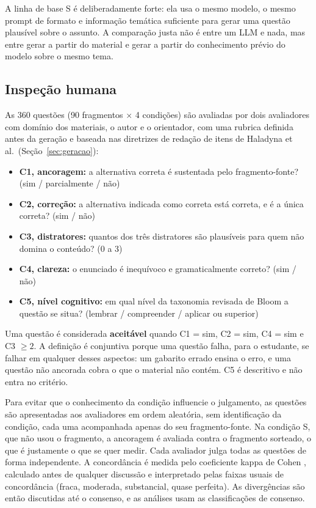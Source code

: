 \documentclass[portuguese,oneside]{tcc}
\begin{document}
A linha de base S é deliberadamente forte: ela usa o mesmo modelo, o mesmo prompt de formato e informação temática suficiente para gerar uma questão plausível sobre o assunto. A comparação justa não é entre um LLM e nada, mas entre gerar a partir do material e gerar a partir do conhecimento prévio do modelo sobre o mesmo tema.

\subsection{Inspeção humana}

As 360 questões (90 fragmentos $\times$ 4 condições) são avaliadas por dois avaliadores com domínio dos materiais, o autor e o orientador, com uma rubrica definida antes da geração e baseada nas diretrizes de redação de itens de Haladyna et al.\ (Seção~\ref{sec:geracao}):

\begin{itemize}
  \item \textbf{C1, ancoragem:} a alternativa correta é sustentada pelo fragmento-fonte? (sim / parcialmente / não)
  \item \textbf{C2, correção:} a alternativa indicada como correta está correta, e é a única correta? (sim / não)
  \item \textbf{C3, distratores:} quantos dos três distratores são plausíveis para quem não domina o conteúdo? (0 a 3)
  \item \textbf{C4, clareza:} o enunciado é inequívoco e gramaticalmente correto? (sim / não)
  \item \textbf{C5, nível cognitivo:} em qual nível da taxonomia revisada de Bloom \cite{AK01} a questão se situa? (lembrar / compreender / aplicar ou superior)
\end{itemize}

Uma questão é considerada \textbf{aceitável} quando C1 = sim, C2 = sim, C4 = sim e C3 $\ge 2$. A definição é conjuntiva porque uma questão falha, para o estudante, se falhar em qualquer desses aspectos: um gabarito errado ensina o erro, e uma questão não ancorada cobra o que o material não contém. C5 é descritivo e não entra no critério.

Para evitar que o conhecimento da condição influencie o julgamento, as questões são apresentadas aos avaliadores em ordem aleatória, sem identificação da condição, cada uma acompanhada apenas do seu fragmento-fonte. Na condição S, que não usou o fragmento, a ancoragem é avaliada contra o fragmento sorteado, o que é justamente o que se quer medir. Cada avaliador julga todas as questões de forma independente. A concordância é medida pelo coeficiente kappa de Cohen \cite{Coh60}, calculado antes de qualquer discussão e interpretado pelas faixas usuais de concordância (fraca, moderada, substancial, quase perfeita). As divergências são então discutidas até o consenso, e as análises usam as classificações de consenso.
\end{document}

